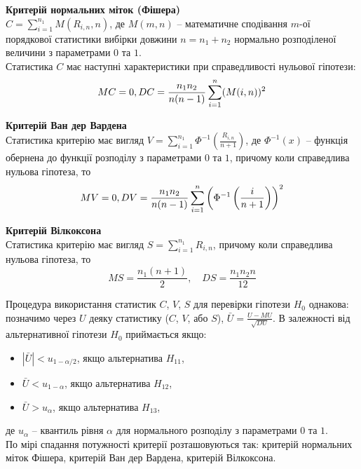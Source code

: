 \textbf{Критерій нормальних міток (Фішера)} \\

$C = \sum_{i=1}^{n_1} M(R_{i, n}, n)$, де $M(m, n)$ -- математичне сподівання $m$-ої порядкової статистики вибірки довжини $n = n_1 + n_2$ нормально розподіленої величини з параметрами $0$ та $1$. \\

Статистика $C$ має наступні характеристики при справедливості нульової гіпотези:
\[ M C = 0, D C = \dfrac{n_1 n_2}{n(n-1)} \displaystyle\sum\limits_{i=1}^n (M(i, n))^2 \]

\textbf{Критерій Ван дер Вардена} \\

Статистика критерію має вигляд $ V = \sum_{i=1}^{n_1} \Phi^{-1} \left( \frac{R_{i,n}}{n+1} \right)$, де $\Phi^{-1}(x)$ -- функція обернена до функції розподілу з параметрами $0$ та $1$, причому коли справедлива нульова гіпотеза, то
\[ M V = 0, DV = \dfrac{n_1 n_2}{n(n-1)} \displaystyle\sum\limits_{i=1}^n \left( \Phi^{-1} \left( \dfrac{i}{n+1} \right) \right)^2 \]

\textbf{Критерій Вілкоксона} \\

Статистика критерію має вигляд $S = \sum_{i=1}^{n_1} R_{i,n}$, причому коли справедлива нульова гіпотеза, то
\[ MS = \dfrac{n_1(n + 1)}{2}, \quad DS = \dfrac{n_1 n_2 n}{12} \]

Процедура використання статистик $C$, $V$, $S$ для перевірки гіпотези $H_0$ однакова: позначимо через $U$ деяку статистику ($C$, $V$, або $S$), $\bar{U} = \frac{U - M U}{\sqrt{D U}}$. В залежності від альтернативної гіпотези $H_0$ приймається якщо:
\begin{itemize}
    \item $|\bar{U}| < u_{1 - \alpha / 2}$, якщо альтернатива $H_{11}$,
    
    \item $\bar{U} < u_{1 - \alpha}$, якщо альтернатива $H_{12}$,
    
    \item $\bar{U} > u_\alpha$, якщо альтернатива $H_{13}$,
\end{itemize}
де $u_\alpha$ -- квантиль рівня $\alpha$ для нормального розподілу з параметрами $0$ та $1$. \\

По мірі спадання потужності критерії розташовуються так: критерій нормальних міток Фішера, критерій Ван дер Вардена, критерій Вілкоксона. \\

